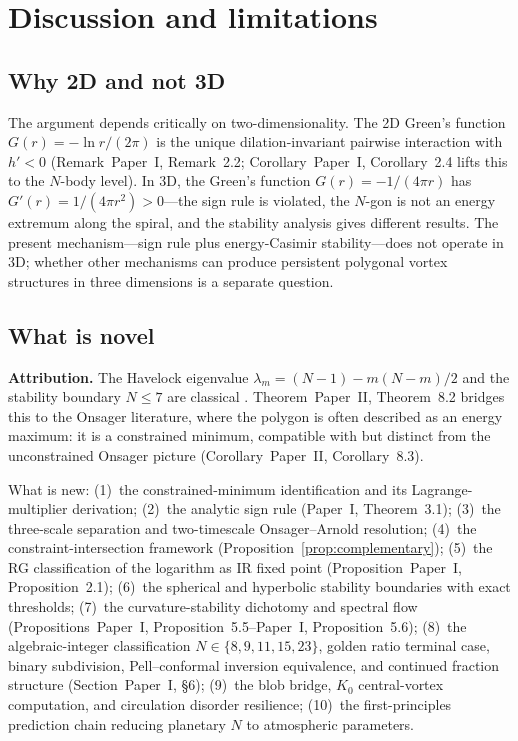 \section{Discussion and limitations}
\label{sec:discussion-new}

\subsection{Why 2D and not 3D}

The argument depends critically on two-dimensionality.  The 2D Green's
function $G(r) = -\ln r/(2\pi)$ is the unique dilation-invariant
pairwise interaction with $h' < 0$
(Remark~Paper~I, Remark~2.2; Corollary~Paper~I, Corollary~2.4
lifts this to the $N$-body level).  In 3D, the Green's function
$G(r) = -1/(4\pi r)$ has $G'(r) = 1/(4\pi r^2) > 0$---the sign
rule is violated, the $N$-gon is not an energy extremum along the
spiral, and the stability analysis gives different results.  The
present mechanism---sign rule plus energy-Casimir stability---does
not operate in 3D; whether other mechanisms can produce persistent
polygonal vortex structures in three dimensions is a separate
question.


\subsection{What is novel}

\noindent\textbf{Attribution.}
The Havelock eigenvalue $\lambda_m = (N{-}1) - m(N{-}m)/2$ and the
stability boundary $N \le 7$ are classical \citep{Havelock1931}.
Theorem~Paper~II, Theorem~8.2 bridges this to the Onsager
literature, where the polygon is often described as an energy
maximum: it is a constrained minimum, compatible with but distinct
from the unconstrained Onsager picture (Corollary~Paper~II, Corollary~8.3).

\smallskip\noindent
What is new:
(1)~the constrained-minimum identification and its
Lagrange-multiplier derivation;
(2)~the analytic sign rule (Paper~I, Theorem~3.1);
(3)~the three-scale separation and two-timescale Onsager--Arnold
resolution;
(4)~the constraint-intersection framework
(Proposition~\ref{prop:complementary});
(5)~the RG classification of the logarithm as IR fixed point
(Proposition~Paper~I, Proposition~2.1);
(6)~the spherical and hyperbolic stability boundaries
with exact thresholds;
(7)~the curvature-stability dichotomy and spectral flow
(Propositions~Paper~I, Proposition~5.5--Paper~I, Proposition~5.6);
(8)~the algebraic-integer classification $N \in \{8,9,11,15,23\}$,
golden ratio terminal case, binary subdivision, Pell--conformal
inversion equivalence, and continued fraction structure
(Section~Paper~I, \S6);
(9)~the blob bridge, $K_0$ central-vortex computation, and
circulation disorder resilience;
(10)~the first-principles prediction chain reducing planetary
$N$ to atmospheric parameters.

